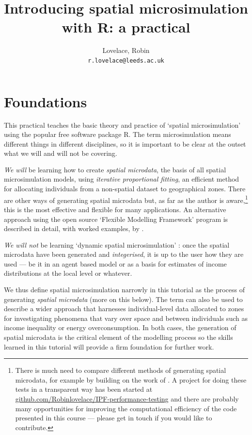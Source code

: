 \documentclass[a4paper, 11pt, twoside]{article}
\begin{document}
 
\title{Introducing spatial microsimulation with R: a practical}
\pagestyle{myheadings}
\author{Lovelace, Robin\\
\texttt{r.lovelace@leeds.ac.uk}}
\maketitle

\tableofcontents

\newpage
\section{Foundations}

This practical teaches the basic theory and practice of `spatial microsimulation'
using the popular free software package R. The term microsimulation means
different things in different disciplines, so it is important to be clear
at the outset what we will and will not be covering.

\emph{We will} be learning how to create \emph{spatial microdata}, the
basis of all spatial microsimulation models, using \emph{iterative
proportional fitting}, an efficient method for allocating individuals from a
non-spatial dataset to geographical zones. There are other ways of generating
spatial microdata but, as far as the author is
aware,\footnote{There is much need
to compare different methods of generating spatial microdata, for example by
building on the work of \citep{harland2012}. A project for doing
these tests in a transparent way has been started at
\href{https://github.com/Robinlovelace/IPF-performance-testing}{github.com/Robinlovelace/IPF-performance-testing}
and there are probably many opportunities for improving the computational efficiency
of the code presented in this course --- please get in touch if you would
like to contribute.}
this is the most effective and flexible for many applications.
An alternative approach using the open source `Flexible Modelling Framework'
program is described in detail, with worked examples, by \citet{harland2013microsimulation}.

\emph{We will not} be learning `dynamic spatial microsimulation'
\citep{Ballas2005b}: once the
spatial microdata have been generated and \emph{integerised}, it is up to the
user how they are used --- be it in an agent based model or as a basis for
estimates of income distributions at the local level or whatever.

We thus define spatial microsimulation narrowly in this tutorial as the process
of generating \emph{spatial microdata} (more on this below). The term
can also be used to describe a wider approach that harnesses individual-level data
allocated to zones for investigating phenomena that vary over space and between individuals
such as income inequality or energy overconsumption. In both cases, the generation
of spatial microdata is the critical element of the modelling process so the skills
learned in this tutorial will provide a firm foundation for further work.
\end{document}

